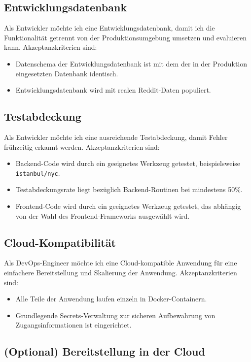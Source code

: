 \documentclass[a4paper, 10pt, conference]{IEEEtran}
\begin{document}
\subsection{Entwicklungsdatenbank}

Als Entwickler möchte ich eine Entwicklungsdatenbank, damit ich die Funktionalität getrennt von der Produktionsumgebung umsetzen und evaluieren kann. Akzeptanzkriterien sind:
\begin{itemize}
\item Datenschema der Entwicklungsdatenbank ist mit dem der in der Produktion eingesetzten Datenbank identisch.
\item Entwicklungsdatenbank wird mit realen Reddit-Daten populiert.
\end{itemize}

\subsection{Testabdeckung}

Als Entwickler möchte ich eine ausreichende Testabdeckung, damit Fehler frühzeitig erkannt werden.  Akzeptanzkriterien sind:
\begin{itemize}
\item Backend-Code wird durch ein geeignetes Werkzeug getestet, beispielsweise \texttt{istanbul/nyc}.
\item Testabdeckungsrate liegt bezüglich Backend-Routinen bei mindestens 50\%.
\item Frontend-Code wird durch ein geeignetes Werkzeug getestet, das abhängig von der Wahl des Frontend-Frameworks ausgewählt wird.
\end{itemize}

\subsection{Cloud-Kompatibilität}

Als DevOps-Engineer möchte ich eine Cloud-kompatible Anwendung für eine einfachere Bereitstellung und Skalierung der Anwendung. Akzeptanzkriterien sind:
\begin{itemize}
\item Alle Teile der Anwendung laufen einzeln in Docker-Containern.
\item Grundlegende Secrets-Verwaltung zur sicheren Aufbewahrung von Zugangsinformationen ist eingerichtet.
\end{itemize}

\subsection{(Optional) Bereitstellung in der Cloud}
\end{document}
